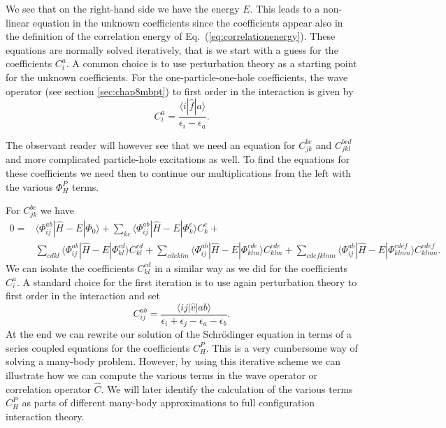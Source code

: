   We see that on the right-hand side we have the energy $E$. This
  leads to a non-linear equation in the unknown coefficients since the coefficients appear also in the definition of the correlation
energy of Eq.~(\ref{eq:correlationenergy}).  These
  equations are normally solved iteratively, that is we  start
  with a guess for the coefficients $C_i^a$. A common choice is to
  use perturbation theory as a starting point for the unknown coefficients. For the one-particle-one-hole coefficients, the wave operator
(see section \ref{sec:chap8mbpt}) to first order in the interaction is given by
  \[
   C_{i}^{a}=\frac{\langle i | \hat{f}|
     a\rangle}{\epsilon_i-\epsilon_a}.
  \]

  The observant reader will however see that we need an equation for
  $C_{jk}^{bc}$ and $C_{jkl}^{bcd}$ and more complicated particle-hole excitations as well.  To find the equations for
  these coefficients we need then to continue our multiplications from
  the left with the various $\Phi_{H}^P$ terms.


  For $C_{jk}^{bc}$ we have
  \begin{align}\label{eq:c2p2h}
  0=&\langle \Phi_{ij}^{ab} | \hat{H} -E| \Phi_0\rangle +
  \sum_{kc}\langle \Phi_{ij}^{ab} | \hat{H} -E|\Phi_{k}^{c} \rangle
  C_{k}^{c}+ \\
  &\sum_{cdkl}\langle \Phi_{ij}^{ab} | \hat{H} -E|\Phi_{kl}^{cd}
  \rangle C_{kl}^{cd}+\sum_{cdeklm}\langle \Phi_{ij}^{ab} | \hat{H}
  -E|\Phi_{klm}^{cde} \rangle C_{klm}^{cde}+\sum_{cdefklmn}\langle
  \Phi_{ij}^{ab} | \hat{H} -E|\Phi_{klmn}^{cdef} \rangle
  C_{klmn}^{cdef}.
  \end{align}
  We can isolate the coefficients $C_{kl}^{cd}$ in a similar way
  as we did for the coefficients $C_{i}^{a}$.  A standard choice for
  the first iteration is to use again perturbation theory to first order in the interaction and set
  \[
  C_{ij}^{ab} =\frac{\langle ij \vert \hat{v} \vert ab
    \rangle}{\epsilon_i+\epsilon_j-\epsilon_a-\epsilon_b}.
  \]
  At the end we can rewrite our solution of the Schr\"odinger equation
  in terms of a series coupled equations for the coefficients $C_H^P$.
  This is a very cumbersome way of solving a many-body
  problem. However, by using this iterative scheme we can illustrate
  how we can compute the various terms in the wave operator or
  correlation operator $\hat{C}$. We will later identify the
  calculation of the various terms $C_H^P$ as parts of different
  many-body approximations to full configuration interaction theory.

